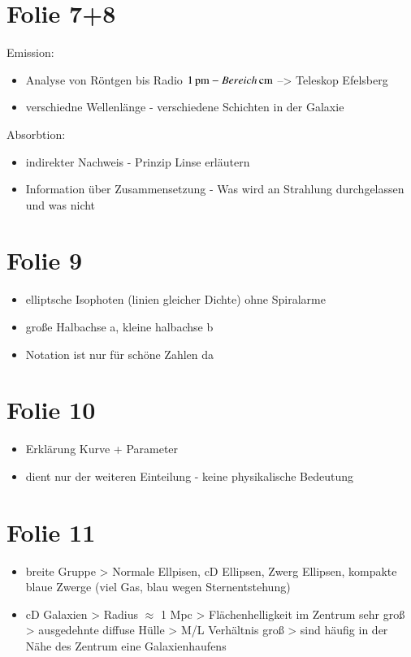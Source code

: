 \section{Folie 7+8}


Emission:

\begin{itemize}
\item Analyse von Röntgen bis Radio $\unit[1]{pm} - \unit[Bereich]{cm}$ --> Teleskop Efelsberg
\item verschiedne Wellenlänge - verschiedene Schichten in der Galaxie
\end{itemize}

Absorbtion:

\begin{itemize}
\item indirekter Nachweis - Prinzip Linse erläutern
\item Information über Zusammensetzung - Was wird an Strahlung durchgelassen und was nicht
\end{itemize}



\section{Folie 9}

\begin{itemize}
\item elliptsche Isophoten (linien gleicher Dichte) ohne Spiralarme
\item große Halbachse a, kleine halbachse b 
\item Notation ist nur für schöne Zahlen da
\end{itemize}


\section{Folie 10}

\begin{itemize}
\item Erklärung Kurve + Parameter
\item dient nur der weiteren Einteilung - keine physikalische Bedeutung
\end{itemize}


\section{Folie 11}

\begin{itemize}
\item breite Gruppe
\subitem > Normale Ellpisen, cD Ellipsen, Zwerg Ellipsen, kompakte blaue Zwerge (viel Gas, blau wegen Sternentstehung)
\item cD Galaxien
\subitem > Radius $\approx$ 1 Mpc 
\subitem > Flächenhelligkeit im Zentrum sehr groß 
\subitem > ausgedehnte diffuse Hülle
\subitem > M/L Verhältnis groß 
\subitem > sind häufig in der Nähe des Zentrum eine Galaxienhaufens
\end{itemize}



